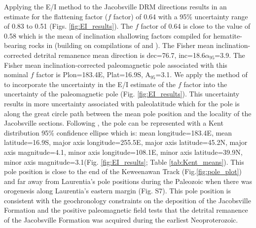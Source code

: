 Applying the E/I method to the Jacobsville DRM directions results in an estimate for the flattening factor ($f$ factor) of 0.64 with a 95\% uncertainty range of 0.83 to 0.51 (Figs. \ref{fig:EI_results}). The $f$ factor of 0.64 is close to the value of 0.58 which is the mean of inclination shallowing factors compiled for hematite-bearing rocks in  (building on compilations of  and ). The Fisher mean inclination-corrected detrital remanence mean direction is dec=76.7\textdegree, inc=18.6\textdegree $\alpha_{95}$=3.9\textdegree. The Fisher mean inclination-corrected paleomagnetic pole associated with this nominal $f$ factor is Plon=183.4\textdegree E, Plat=16.9\textdegree S, A$_{95}$=3.1\textdegree. We apply the method of  to incorporate the uncertainty in the E/I estimate of the $f$ factor into the uncertainty of the paleomagnetic pole (Fig. \ref{fig:EI_results}). This uncertainty results in more uncertainty associated with paleolatitude which for the pole is along the great circle path between the mean pole position and the locality of the Jacobsville sections. Following , the pole can be represented with a Kent distribution 95\% confidence ellipse which is: mean longitude=183.4\textdegree E, mean latitude=16.9\textdegree S, major axis longitude=255.5\textdegree E, major axis latitude=45.2\textdegree N, major axis magnitude=4.1\textdegree, minor axis longitude=108.1\textdegree E, minor axis latitude=39.9\textdegree N, minor axis magnitude=3.1\textdegree (Fig. \ref{fig:EI_results}; Table \ref{tab:Kent_means}). This pole position is close to the end of the Keweenawan Track (Fig.\ref{fig:pole_plot}) and far away from Laurentia's pole positions during the Paleozoic when there was orogenesis along Laurentia's eastern margin (Fig. S7). This pole position is consistent with the geochronology constraints on the deposition of the Jacobsville Formation and the positive paleomagnetic field tests that the detrital remanence of the Jacobsville Formation was acquired during the earliest Neoproterozoic. 


